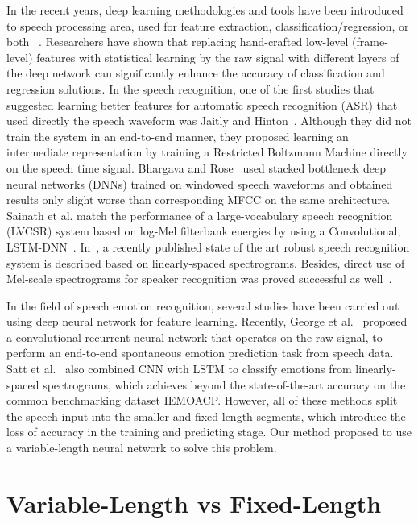 \documentclass[a4paper]{article}
\begin{document}
In the recent years, deep learning methodologies and tools have been introduced to speech processing area, used for feature extraction, classification/regression, or both ~\cite{han2014, lee2015, huang2014, le2013, rana2016, chernykh2017}. Researchers have shown that replacing hand-crafted low-level (frame-level) features with statistical learning by the raw signal with different layers of the deep network can significantly enhance the accuracy of classification and regression solutions. In the speech recognition, one of the first studies that suggested learning better features for automatic speech recognition (ASR) that used directly the speech waveform was Jaitly and Hinton~\cite{jaitly2012}. Although they did not train the system in an end-to-end manner, they proposed learning an intermediate representation by training a Restricted Boltzmann Machine directly on the speech time signal. Bhargava and Rose~\cite{bhargava2015} used stacked bottleneck deep neural networks (DNNs) trained on windowed speech waveforms and obtained results only slight worse than corresponding MFCC on the same architecture. Sainath et al. match the performance of a large-vocabulary speech recognition (LVCSR) system based on log-Mel filterbank energies by using a Convolutional, LSTM-DNN~\cite{sainath2015a, sainath2015b}. In~\cite{hannun2014, amodei2015}, a recently published state of the art robust speech recognition system is described based on linearly-spaced spectrograms. Besides, direct use of Mel-scale spectrograms for speaker recognition was proved successful as well~\cite{variani2014}.

In the field of speech emotion recognition, several studies have been carried out using deep neural network for feature learning. Recently, George et al.~\cite{trigeorgis2016} proposed a convolutional recurrent neural network that operates on the raw signal, to perform an end-to-end spontaneous emotion prediction task from speech data. Satt et al.~\cite{satt2017} also combined CNN with LSTM to classify emotions from linearly-spaced spectrograms, which achieves beyond the state-of-the-art accuracy on the common benchmarking dataset IEMOACP. However, all of these methods split the speech input into the smaller and fixed-length segments, which introduce the loss of accuracy in the training and predicting stage. Our method proposed to use a variable-length neural network to solve this problem.

\section{Variable-Length vs Fixed-Length}
\label{sec:var_len_vs_fixed_len}
\end{document}
